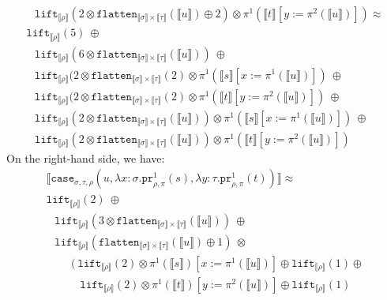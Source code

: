 \documentclass[a4paper,UKenglish,cleveref,autoref,numberwithinsect]{lipics-v2019}
\theoremstyle{definition}
\newcommand{\abs}[2]{\lambda #1.#2}
\newcommand{\flatten}{\mathtt{flatten}}
\newcommand{\lift}{\mathtt{lift}}
\newcommand{\typeinterpret}[1]{\llbracket #1 \rrbracket}
\newcommand{\interpret}[1]{\llbracket #1 \rrbracket}
\newcommand{\proj}{\mathtt{pr}}
\begin{document}
\begin{itemize}
\[\begin{array}{l}
  \phantom{A}
    \lift_{\typeinterpret{\rho}}(2 \otimes
    \flatten_{\typeinterpret{\sigma} \times
    \typeinterpret{\tau}}(\interpret{u}) \oplus 2) \otimes
    \pi^1(\interpret{t}[y:=\pi^2(\interpret{u})]) \approx \\
  \lift_{\typeinterpret{\rho}}(5)\ \oplus \\
  \phantom{A}
    \lift_{\typeinterpret{\rho}}(6 \otimes
    \flatten_{\typeinterpret{\sigma} \times \typeinterpret{\tau}}(
    \interpret{u}))\ \oplus \\
  \phantom{A}
    \lift_{\typeinterpret{\rho}}(2 \otimes
    \flatten_{\typeinterpret{\sigma} \times
    \typeinterpret{\tau}}(2) \otimes
    \pi^1(\interpret{s}[x:=\pi^1(\interpret{u})])\ \oplus \\
  \phantom{A}
    \lift_{\typeinterpret{\rho}}(2 \otimes
    \flatten_{\typeinterpret{\sigma} \times
    \typeinterpret{\tau}}(2) \otimes
    \pi^1(\interpret{t}[y:=\pi^2(\interpret{u})])\ \oplus \\
  \phantom{A}
    \lift_{\typeinterpret{\rho}}(2 \otimes
    \flatten_{\typeinterpret{\sigma} \times
    \typeinterpret{\tau}}(\interpret{u})) \otimes
    \pi^1(\interpret{s}[x:=\pi^1(\interpret{u})])\ \oplus \\
  \phantom{A}
    \lift_{\typeinterpret{\rho}}(2 \otimes
    \flatten_{\typeinterpret{\sigma} \times
    \typeinterpret{\tau}}(\interpret{u})) \otimes
    \pi^1(\interpret{t}[y:=\pi^2(\interpret{u})])
  \end{array}
  \]
  On the right-hand side, we have:
  \[
  \begin{array}{l}
  \interpret{\mathtt{case}_{\sigma,\tau,\rho}(u,\abs{x:\sigma}{
  \proj^1_{\rho,\pi}(s)},\abs{y:\tau}{\proj^1_{\rho,\pi}(t)})} \approx \\
  \lift_{\typeinterpret{\rho}}(2)\ \oplus \\
  \phantom{A}
    \lift_{\typeinterpret{\rho}}(3 \otimes
    \flatten_{\typeinterpret{\sigma} \times \typeinterpret{\tau}}(
    \interpret{u}))\ \oplus \\
  \phantom{A}
    \lift_{\typeinterpret{\rho}}(
    \flatten_{\typeinterpret{\sigma} \times \typeinterpret{\tau}}(
    \interpret{u}) \oplus 1)\ \otimes \\
  \phantom{ABC}
    (\ \lift_{\typeinterpret{\rho}}(2) \otimes \pi^1(\interpret{s})[
    x:=\pi^1(\interpret{u})] \oplus \lift_{\typeinterpret{\rho}}(1)
    \oplus \\
  \phantom{ABCD}
    \lift_{\typeinterpret{\rho}}(2) \otimes \pi^1(\interpret{t})[
    y:=\pi^2(\interpret{u})] \oplus \lift_{\typeinterpret{\rho}}(1)

\end{array}\]
\end{itemize}
\end{document}
